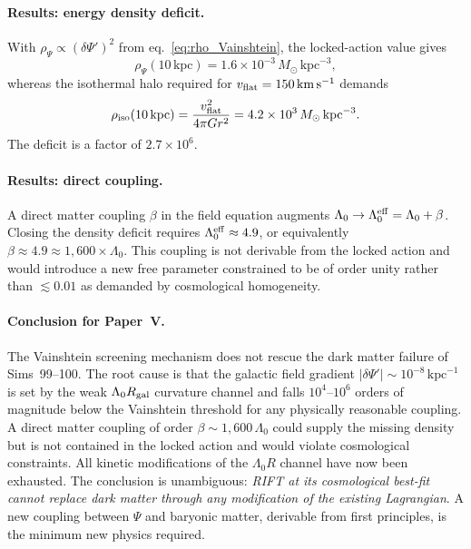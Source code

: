 \documentclass[12pt,a4paper]{article}
\begin{document}
\paragraph{Results: energy density deficit.}
With $\rho_\Psi \propto (\delta\Psi')^2$ from eq.~\eqref{eq:rho_Vainshtein},
the locked-action value gives
\begin{equation}
\rho_\Psi(10\,\mathrm{kpc}) = 1.6\times10^{-3}\,M_\odot\,\mathrm{kpc}^{-3},
\end{equation}
whereas the isothermal halo required for $v_{\rm flat} = 150\,\mathrm{km\,s^{-1}}$ demands
\begin{equation}
\rho_{\rm iso}(10\,\mathrm{kpc}) = \frac{v_{\rm flat}^2}{4\pi G r^2}
  = 4.2\times10^{3}\,M_\odot\,\mathrm{kpc}^{-3}.
\end{equation}
The deficit is a factor of $2.7\times10^6$.

\paragraph{Results: direct coupling.}
A direct matter coupling $\beta$ in the field equation augments
$\Lambda_0 \to \Lambda_0^{\rm eff} = \Lambda_0 + \beta$.  Closing the density
deficit requires $\Lambda_0^{\rm eff} \approx 4.9$, or equivalently
$\beta \approx 4.9 \approx 1{,}600 \times \Lambda_0$.  This coupling is not
derivable from the locked action and would introduce a new free parameter
constrained to be of order unity rather than $\lesssim 0.01$ as demanded by
cosmological homogeneity.

\paragraph{Conclusion for Paper~V.}
The Vainshtein screening mechanism does not rescue the dark matter failure of
Sims~99--100.  The root cause is that the galactic field gradient
$|\delta\Psi'| \sim 10^{-8}\,\mathrm{kpc}^{-1}$ is set by the weak
$\Lambda_0 R_{\rm gal}$ curvature channel and falls $10^{4}$--$10^{6}$ orders of
magnitude below the Vainshtein threshold for any physically reasonable coupling.
A direct matter coupling of order $\beta \sim 1{,}600\,\Lambda_0$ could supply the
missing density but is not contained in the locked action and would violate
cosmological constraints.  All kinetic modifications of the $\Lambda_0 R$ channel
have now been exhausted.  The conclusion is unambiguous: \emph{RIFT at its
cosmological best-fit cannot replace dark matter through any modification of the
existing Lagrangian}.  A new coupling between $\Psi$ and baryonic matter,
derivable from first principles, is the minimum new physics required.
\end{document}
